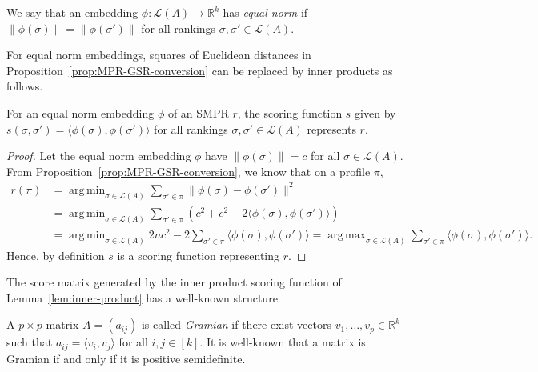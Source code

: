 \documentclass[prodmode,acmec]{ec-acmsmall}
\newcommand{\calL}{{\mathcal{L}}}
\newcommand{\rank}{{\calL(A)}}
\DeclareMathOperator*{\argmax}{arg\,max}
\DeclareMathOperator*{\argmin}{arg\,min}
\begin{document}
\begin{definition}
We say that an embedding $\phi : \rank \rightarrow \mathbb{R}^k$ has \emph{equal norm} if $\|\phi(\sigma)\| = \|\phi(\sigma')\|$ for all rankings $\sigma,\sigma' \in \rank$.
\end{definition}

For equal norm embeddings, squares of Euclidean distances in Proposition~\ref{prop:MPR-GSR-conversion} can be replaced by inner products as follows.
\begin{lemma}
For an equal norm embedding $\phi$ of an SMPR $r$, the scoring function $s$ given by $s(\sigma,\sigma') = \langle \phi(\sigma),\phi(\sigma') \rangle$ for all rankings $\sigma,\sigma' \in \rank$ represents $r$. 
\label{lem:inner-product}
\end{lemma}
\begin{proof}
Let the equal norm embedding $\phi$ have $\|\phi(\sigma)\| = c$ for all $\sigma \in \rank$. From Proposition~\ref{prop:MPR-GSR-conversion}, we know that on a profile $\pi$, 
\begin{align*}
r(\pi) &= \argmin_{\sigma \in \rank} \sum_{\sigma' \in \pi} \|\phi(\sigma)-\phi(\sigma')\|^2 \\
&= \argmin_{\sigma \in \rank} \sum_{\sigma' \in \pi} \left( c^2 + c^2 - 2 \langle \phi(\sigma), \phi(\sigma')\rangle\right) \\
&= \argmin_{\sigma \in \rank} 2 n c^2 - 2 \sum_{\sigma' \in \pi} \langle \phi(\sigma), \phi(\sigma')\rangle = \argmax_{\sigma \in \rank} \sum_{\sigma' \in \pi} \langle \phi(\sigma), \phi(\sigma')\rangle.
\end{align*}
Hence, by definition $s$ is a scoring function representing $r$. 
\end{proof}

The score matrix generated by the inner product scoring function of Lemma~\ref{lem:inner-product} has a well-known structure. 
\begin{definition}
A $p \times p$ matrix $A = (a_{ij})$ is called \emph{Gramian} if there exist vectors $v_1,\ldots,v_p \in \mathbb{R}^k$ such that $a_{ij} = \langle v_i,v_j \rangle$ for all $i,j \in [k]$. It is well-known that a matrix is Gramian if and only if it is positive semidefinite. 
\end{definition}
\end{document}
